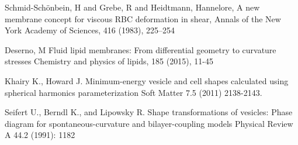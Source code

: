 \begin{thebibliography}{9}
  
  Schmid-Sch{\"o}nbein, H and Grebe, R and Heidtmann, Hannelore,
  A new membrane concept for viscous RBC deformation in shear,
  Annals of the New York Academy of Sciences, 416 (1983), 225--254
  
  Deserno, M
  Fluid lipid membranes: From differential geometry to curvature stresses
  Chemistry and physics of lipids, 185 (2015), 11-45

  Khairy K., Howard J.
  Minimum-energy vesicle and cell shapes calculated using spherical
  harmonics parameterization
  Soft Matter 7.5 (2011) 2138-2143.

  Seifert U., Berndl K., and Lipowsky R.
  Shape transformations of vesicles: Phase diagram for
  spontaneous-curvature and bilayer-coupling models
  Physical Review A 44.2 (1991): 1182
  
\end{thebibliography}
